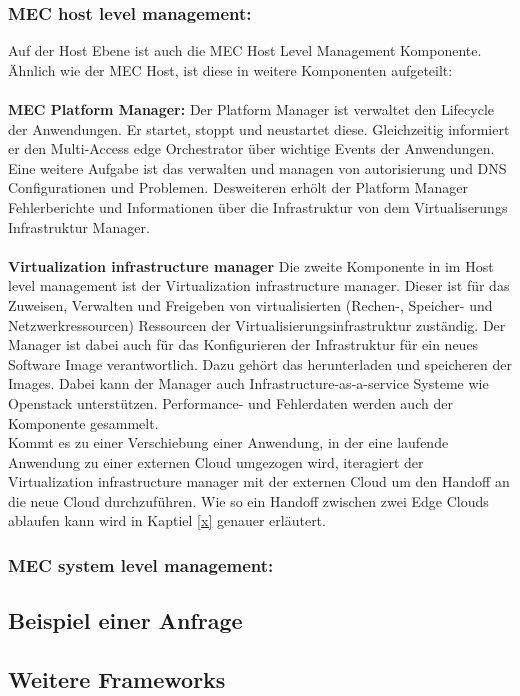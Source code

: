 \documentclass[runningheads]{llncs}
\numberwithin{figure}{section}
\begin{document}
\subsubsection{MEC host level management:}
Auf der Host Ebene ist auch die MEC Host Level Management Komponente. Ähnlich wie der MEC Host, ist diese in weitere 
Komponenten aufgeteilt:
\\
\\
\textbf{MEC Platform Manager:} Der Platform Manager ist verwaltet den Lifecycle der Anwendungen. Er startet, stoppt und neustartet diese.
Gleichzeitig informiert er den Multi-Access edge Orchestrator über wichtige Events der Anwendungen. 
Eine weitere Aufgabe ist das verwalten und managen von autorisierung und DNS Configurationen und Problemen.
Desweiteren erhölt der Platform Manager Fehlerberichte und Informationen über die Infrastruktur von dem Virtualiserungs Infrastruktur Manager.
\\
\\ 
\textbf{Virtualization infrastructure manager} Die zweite Komponente in im Host level management ist der Virtualization infrastructure
manager. Dieser ist für das Zuweisen, Verwalten und Freigeben von virtualisierten (Rechen-, Speicher- und Netzwerkressourcen)
Ressourcen der Virtualisierungsinfrastruktur zuständig. Der Manager ist dabei auch für das Konfigurieren der Infrastruktur für 
ein neues Software Image verantwortlich. Dazu gehört das herunterladen und speicheren der Images. Dabei kann der Manager auch 
Infrastructure-as-a-service Systeme wie Openstack unterstützen. Performance- und Fehlerdaten werden auch der Komponente gesammelt.
\\
Kommt es zu einer Verschiebung einer Anwendung, in der eine laufende Anwendung zu einer externen Cloud umgezogen wird,
iteragiert der Virtualization infrastructure manager mit der externen Cloud um den Handoff an die neue Cloud durchzuführen.
Wie so ein Handoff zwischen zwei Edge Clouds ablaufen kann wird in Kaptiel \ref{x} genauer erläutert.
\subsubsection{MEC system level management:}


\subsection{Beispiel einer Anfrage}

\subsection{Weitere Frameworks}
\label{subsec:Weitere Frameworks}
\end{document}
